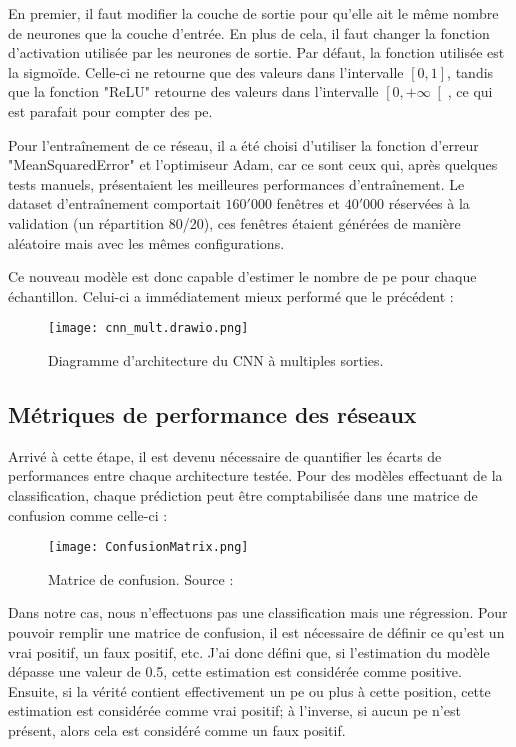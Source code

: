 En premier, il faut modifier la couche de sortie pour qu'elle ait le même nombre de neurones que la couche d'entrée. 
En plus de cela, il faut changer la fonction d'activation utilisée par les neurones de sortie.
Par défaut, la fonction utilisée est la sigmoïde. Celle-ci ne retourne que des valeurs dans l'intervalle $ \left[ 0, 1\right] $,
tandis que la fonction "ReLU" retourne des valeurs dans l'intervalle $ \left[0, +\infty\right[ $, ce qui est parafait pour compter
des \gls{pe}.

Pour l'entraînement de ce réseau, il a été choisi d'utiliser la fonction d'erreur "MeanSquaredError" et l'optimiseur Adam, car ce
sont ceux qui, après quelques tests manuels, présentaient les meilleures performances d'entraînement. 
Le dataset d'entraînement comportait  $160'000$ fenêtres et $40'000$ réservées à la validation (un répartition 80/20),
ces fenêtres étaient générées de manière aléatoire mais avec les mêmes configurations.

Ce nouveau modèle est donc capable d'estimer le nombre de \gls{pe} pour chaque échantillon.
Celui-ci a immédiatement mieux performé que le précédent :

\begin{figure}[tbph!]
	\centering
	\texttt{[image: cnn\_mult.drawio.png]}
	\caption[Diagramme d'architecture du CNN à multiples sorties]{Diagramme d'architecture du CNN à multiples sorties.}
\end{figure}

\subsection{Métriques de performance des réseaux}
Arrivé à cette étape, il est devenu nécessaire de quantifier les écarts de performances entre chaque architecture testée.
Pour des modèles effectuant de la classification, chaque prédiction peut être comptabilisée dans une matrice de confusion comme celle-ci :
\newpage
\begin{figure}[tbph!]
	\centering
	\texttt{[image: ConfusionMatrix.png]}
	\caption[Matrice de confusion]{Matrice de confusion. Source : \cite{ConfusionMatrixImage}}
\end{figure}

Dans notre cas, nous n'effectuons pas une classification mais une régression.
Pour pouvoir remplir une matrice de confusion, il est nécessaire de définir ce qu'est un vrai positif, un faux positif, etc.
J'ai donc défini que, si l'estimation du modèle dépasse une valeur de 0.5, cette estimation
est considérée comme positive. Ensuite, si la vérité contient effectivement un \gls{pe} ou plus à cette position, cette estimation 
est considérée comme vrai positif; à l'inverse, si aucun \gls{pe} n'est présent, alors cela est considéré comme un faux positif.

